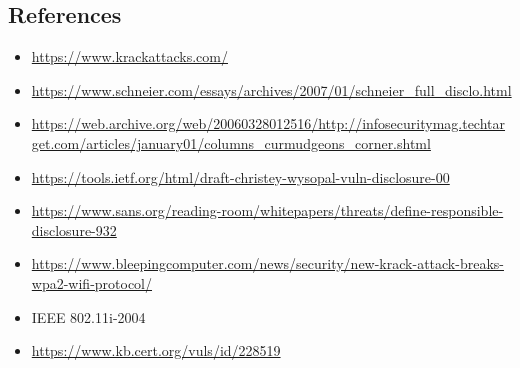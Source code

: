 \documentclass[12pt]{article}
\begin{document}
\begin{doublespace}

\newpage
\section*{\hfil References \hfil}
\begin{itemize}[label=]
	\item \url{https://www.krackattacks.com/}
	\item \url{https://www.schneier.com/essays/archives/2007/01/schneier_full_disclo.html}
  \item \url{https://web.archive.org/web/20060328012516/http://infosecuritymag.techtarget.com/articles/january01/columns_curmudgeons_corner.shtml}
  \item \url{https://tools.ietf.org/html/draft-christey-wysopal-vuln-disclosure-00}
  \item \url{https://www.sans.org/reading-room/whitepapers/threats/define-responsible-disclosure-932}
  \item \url{https://www.bleepingcomputer.com/news/security/new-krack-attack-breaks-wpa2-wifi-protocol/}
  \item IEEE 802.11i-2004
  \item \url{https://www.kb.cert.org/vuls/id/228519}
\end{itemize}

\end{doublespace}
\end{document}
